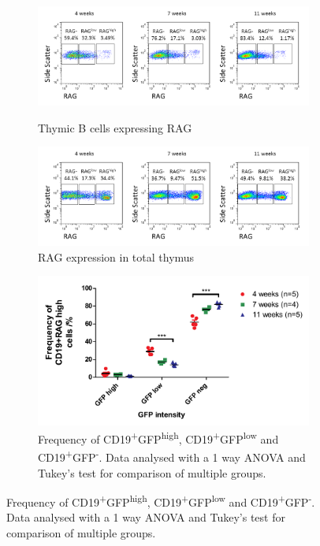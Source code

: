 \begin{figure}
	\begin{subfigure}{\textwidth}
	\includegraphics[width=\textwidth]{Figures/RAGhighlownegthyB.png}
	\caption{Thymic B cells expressing RAG}
	\label{subfig:RAGhighlownegthyB}
	\includegraphics[width=\textwidth]{Figures/RAGhighlownegtotalthy.png}
	\caption{RAG expression in total thymus}
		\label{subfig:RAGhighlownegtotthy}
	\end{subfigure}
	\begin{subfigure}{\textwidth}
	\includegraphics[width=\textwidth]{Figures/RAGhighlownegative.pdf}
	\caption{Frequency of CD19\textsuperscript{+}GFP\textsuperscript{high}, CD19\textsuperscript{+}GFP\textsuperscript{low} and CD19\textsuperscript{+}GFP\textsuperscript{-}. Data analysed with a 1 way ANOVA and Tukey's test for comparison of multiple groups.}
	\label{subfig:RAGhighlowneggraph}

\end{subfigure}
\end{figure}
